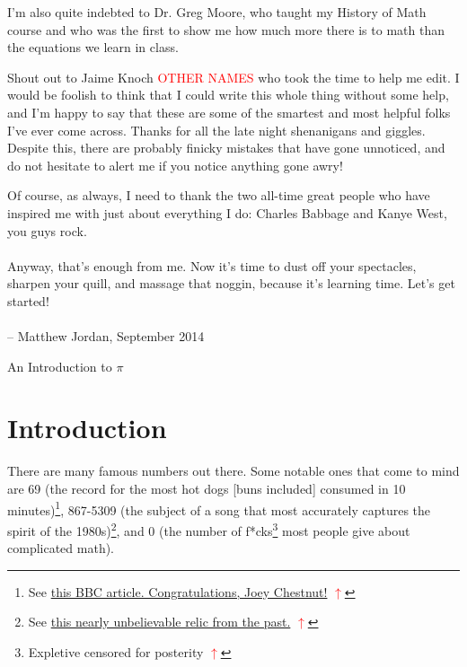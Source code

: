 \documentclass[11pt,titlepage]{article}
\begin{document}
I'm also quite indebted to Dr. Greg Moore, who taught my History of Math course and who was the first to show me how much more there is to math than the equations we learn in class. 

Shout out to Jaime Knoch \textcolor{red}{OTHER NAMES} who took the time to help me edit. I would be foolish to think that I could write this whole thing without some help, and I'm happy to say that these are some of the smartest and most helpful folks I've ever come across. Thanks for all the late night shenanigans and giggles. Despite this, there are probably finicky mistakes that have gone unnoticed, and do not hesitate to alert me if you notice anything gone awry!

Of course, as always, I need to thank the two all-time great people who have inspired me with just about everything I do: Charles Babbage and Kanye West, you guys rock. 
\\ \\
\indent
Anyway, that's enough from me. Now it's time to dust off your spectacles, sharpen your quill, and massage that noggin, because it's learning time. Let's get started! 
\\ \\
-- Matthew Jordan, September 2014  

\newpage 

\tableofcontents

\newpage
\begin{center}
{\huge An Introduction to $\pi$}
\end{center}
\section*{Introduction}


There are many famous numbers out there. Some notable ones that come to mind are 69\label{69} (the record for the most hot dogs [buns included] consumed in 10 minutes)\footnote{See \href{http://www.bbc.com/news/world-us-canada-23192352}{this BBC article. Congratulations, Joey Chestnut!} \hyperref[69]{\textbf{\textcolor{red}{$\uparrow$}}}}, 867-5309 \label{867} (the subject of a song that most accurately captures the spirit of the 1980s)\footnote{See \href{http://www.youtube.com/watch?v=axLRUszuu9I&feature=kp}{this nearly unbelievable relic from the past.} \hyperref[867]{\textbf{\textcolor{red}{$\uparrow$}}}}, and 0\label{0} (the number of f*cks\footnote{Expletive censored for posterity \hyperref[0]{\textbf{\textcolor{red}{$\uparrow$}}}} most people give about complicated math).
\end{document}
